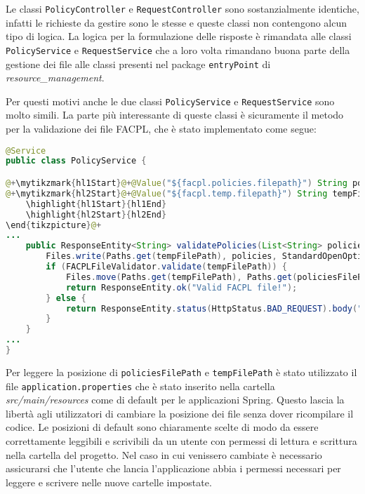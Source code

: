 Le classi \texttt{PolicyController} e \texttt{RequestController} sono sostanzialmente identiche, infatti le richieste da gestire sono le stesse e queste classi non contengono alcun tipo di logica. La logica per la formulazione delle risposte è rimandata alle classi \texttt{PolicyService} e \texttt{RequestService} che a loro volta rimandano buona parte della gestione dei file alle classi presenti nel package \texttt{entryPoint} di \emph{resource\_management}.\par
Per questi motivi anche le due classi \texttt{PolicyService} e \texttt{RequestService} sono molto simili. La parte più interessante di queste classi è sicuramente il metodo per la validazione dei file FACPL, che è stato implementato come segue:
\begin{lstlisting}[language=Java, caption=Metodo validatePolicies, label=code:PolicyServiceValidate, basicstyle=\fontsize{9}{11}\ttfamily]
@Service
public class PolicyService {

@+\mytikzmark{hl1Start}@+@Value("${facpl.policies.filepath}") String policiesFilePath;@+\mytikzmark{hl1End}@+
@+\mytikzmark{hl2Start}@+@Value("${facpl.temp.filepath}") String tempFilePath;@+\mytikzmark{hl2End}@+@+\begin{tikzpicture}[remember picture, overlay]
    \highlight{hl1Start}{hl1End}
    \highlight{hl2Start}{hl2End}
\end{tikzpicture}@+
...
    public ResponseEntity<String> validatePolicies(List<String> policies) throws IOException {
        Files.write(Paths.get(tempFilePath), policies, StandardOpenOption.CREATE, StandardOpenOption.TRUNCATE_EXISTING);
        if (FACPLFileValidator.validate(tempFilePath)) {
            Files.move(Paths.get(tempFilePath), Paths.get(policiesFilePath), StandardCopyOption.REPLACE_EXISTING);
            return ResponseEntity.ok("Valid FACPL file!");
        } else {
            return ResponseEntity.status(HttpStatus.BAD_REQUEST).body("Policy validation failed");
        }
    }
...
}
\end{lstlisting}
Per leggere la posizione di \texttt{policiesFilePath} e \texttt{tempFilePath} è stato utilizzato il file \texttt{application.properties} che è stato inserito nella cartella \emph{src/main/resources} come di default per le applicazioni Spring. Questo lascia la libertà agli utilizzatori di cambiare la posizione dei file senza dover ricompilare il codice. Le posizioni di default sono chiaramente scelte di modo da essere correttamente leggibili e scrivibili da un utente con permessi di lettura e scrittura nella cartella del progetto. Nel caso in cui venissero cambiate è necessario assicurarsi che l'utente che lancia l'applicazione abbia i permessi necessari per leggere e scrivere nelle nuove cartelle impostate.\par
